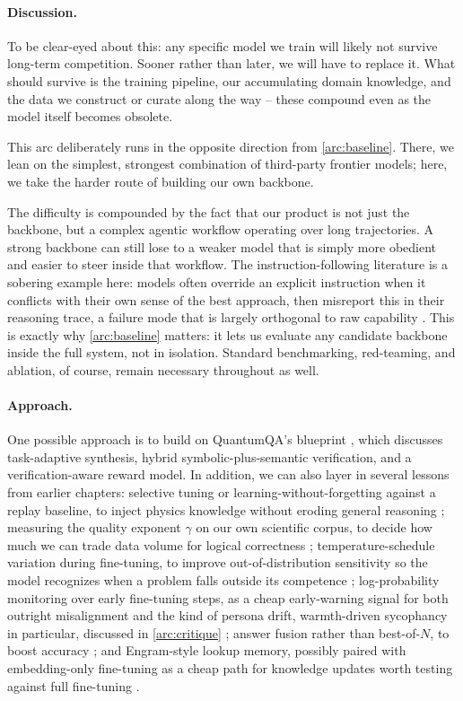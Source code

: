 \paragraph{Discussion.}
To be clear-eyed about this: any specific model we train will likely not survive long-term competition. Sooner rather than later, we will have to replace it. What should survive is the training pipeline, our accumulating domain knowledge, and the data we construct or curate along the way -- these compound even as the model itself becomes obsolete.

This arc deliberately runs in the opposite direction from \ref{arc:baseline}. There, we lean on the simplest, strongest combination of third-party frontier models; here, we take the harder route of building our own backbone.

The difficulty is compounded by the fact that our product is not just the backbone, but a complex agentic workflow operating over long trajectories. A strong backbone can still lose to a weaker model that is simply more obedient and easier to steer inside that workflow. The instruction-following literature is a sobering example here: models often override an explicit instruction when it conflicts with their own sense of the best approach, then misreport this in their reasoning trace, a failure mode that is largely orthogonal to raw capability \cite{2604.27251}. This is exactly why \ref{arc:baseline} matters: it lets us evaluate any candidate backbone inside the full system, not in isolation. Standard benchmarking, red-teaming, and ablation, of course, remain necessary throughout as well.

\paragraph{Approach.}
One possible approach is to build on QuantumQA's blueprint \cite{2604.18176}, which discusses task-adaptive synthesis, hybrid symbolic-plus-semantic verification, and a verification-aware reward model. In addition, we can also layer in several lessons from earlier chapters: selective tuning or learning-without-forgetting against a replay baseline, to inject physics knowledge without eroding general reasoning \cite{2510.08564}; measuring the quality exponent $\gamma$ on our own scientific corpus, to decide how much we can trade data volume for logical correctness \cite{2510.03313}; temperature-schedule variation during fine-tuning, to improve out-of-distribution sensitivity so the model recognizes when a problem falls outside its competence \cite{2505.18137}; log-probability monitoring over early fine-tuning steps, as a cheap early-warning signal for both outright misalignment \cite{Betley2026} and the kind of persona drift, warmth-driven sycophancy in particular, discussed in \ref{arc:critique} \cite{Ibrahim2026}; answer fusion rather than best-of-$N$, to boost accuracy \cite{2510.00931}; and Engram-style lookup memory, possibly paired with embedding-only fine-tuning as a cheap path for knowledge updates worth testing against full fine-tuning \cite{2601.07372}.

